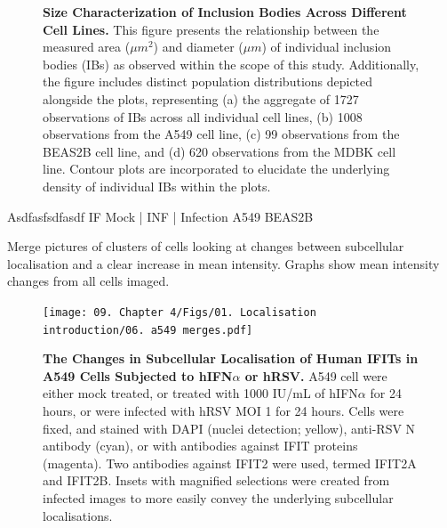 \begin{figure}
    \caption[Size Characterization of Inclusion Bodies Across Different Cell Lines.]{\textbf{Size Characterization of Inclusion Bodies Across Different Cell Lines.} This figure presents the relationship between the measured area (\(\mu m^2\)) and diameter (\(\mu m\)) of individual inclusion bodies (IBs) as observed within the scope of this study. Additionally, the figure includes distinct population distributions depicted alongside the plots, representing (a) the aggregate of 1727 observations of IBs across all individual cell lines, (b) 1008 observations from the A549 cell line, (c) 99 observations from the BEAS2B cell line, and (d) 620 observations from the MDBK cell line. Contour plots are incorporated to elucidate the underlying density of individual IBs within the plots.}
    \label{fig:Size Characterization of Inclusion Bodies Across Different Cell Lines}
    
\end{figure}


Asdfasfsdfasdf \newline
IF Mock | INF | Infection \newline
A549 BEAS2B

Merge pictures of clusters of cells looking at changes between subcellular localisation and a clear increase in mean intensity. Graphs show mean intensity changes from all cells imaged.

\begin{figure}
    \centering
    \vspace{-15.74707pt}
    \texttt{[image: 09. Chapter 4/Figs/01. Localisation introduction/06. a549 merges.pdf]}
    \caption[The Changes in Subcellular Localisation of Human IFITs in A549 Cells Subjected to hIFN\(\alpha\) or hRSV.]{\textbf{The Changes in Subcellular Localisation of Human IFITs in A549 Cells Subjected to hIFN\(\alpha\) or hRSV.} A549 cell were either mock treated, or treated with 1000 IU/mL of hIFN\(\alpha\) for 24 hours, or were infected with hRSV MOI 1 for 24 hours. Cells were fixed, and stained with DAPI (nuclei detection; yellow), anti-RSV N antibody (cyan), or with antibodies against IFIT proteins (magenta). Two antibodies against IFIT2 were used, termed IFIT2A and IFIT2B. Insets with magnified selections were created from infected images to more easily convey the underlying subcellular localisations.}
    \label{fig:The Changes in Subcellular Localisation of Human IFITs in A549 Cells Subjected to hIFNa or hRSV.}
\end{figure}

